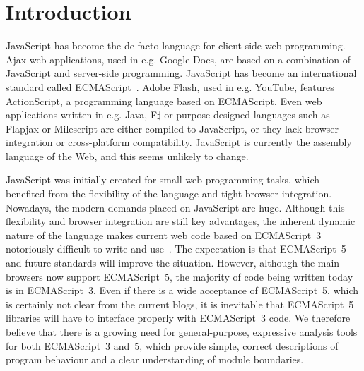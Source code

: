 \documentclass{article}
\begin{document}
\section{Introduction} 




JavaScript has become the de-facto  language for client-side web programming. Ajax web applications, used in e.g.  Google Docs, are based on a combination of JavaScript and server-side programming. JavaScript has become an international standard called ECMAScript~\cite{ecma262}. Adobe Flash, used in e.g.  YouTube, features  ActionScript,  a programming language based on ECMAScript.  Even web applications written in e.g.  Java, F$\sharp$  or purpose-designed languages such as Flapjax or Milescript are either compiled to JavaScript, or they lack browser integration or cross-platform compatibility.  JavaScript is currently the assembly language of the Web, and this seems  unlikely to change.







JavaScript was initially created for small web-programming tasks, which benefited from the flexibility of the language and tight browser integration. Nowadays, the modern demands placed on JavaScript are huge. Although this flexibility and browser integration are still key advantages, the inherent dynamic nature of the language makes current web code based on ECMAScript~3 notoriously difficult to write and use~\cite{MMT-APLAS-TR08,Guha2010,Richards2010}.  The expectation is that ECMAScript~5 and future standards will improve the situation. However, although the main browsers now support ECMAScript~5, the majority of code being written today is in ECMAScript~3. Even if there is a wide acceptance of ECMAScript~5, which is certainly not clear from the current blogs, it is inevitable that
 ECMAScript~5 libraries  will have to interface properly with ECMAScript~3 code.
We  therefore believe that there is a growing need for general-purpose,  expressive analysis tools for both ECMAScript~3 and~5, which provide  simple, correct descriptions of program behaviour and  a clear understanding of module boundaries. 
\end{document}
